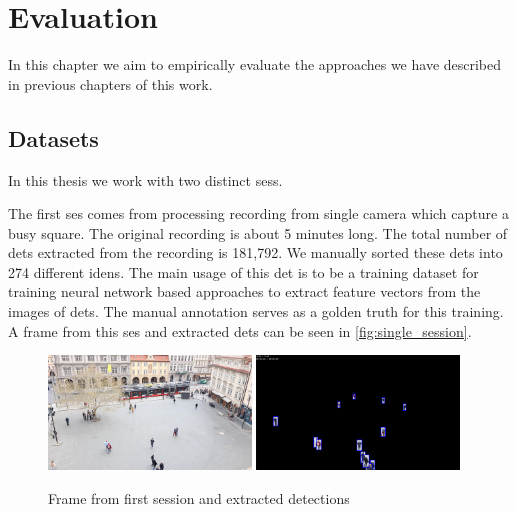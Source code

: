 \chapter{Evaluation}


\label{ch:evaluation}

In this chapter we aim to empirically evaluate the approaches we have described
in previous chapters of this work.

\section{Datasets}

In this thesis we work with two distinct \glspl{ses}.

The first \gls{ses} comes from processing recording from single camera which
capture a busy square. The original recording is about 5 minutes long. The total
number of \glspl{det} extracted from the recording is 181,792. We manually sorted
these \glspl{det} into 274 different \glspl{iden}. The main usage of this
\gls{det} is to be a training dataset for training neural network based
approaches to extract feature vectors from the images of \glspl{det}. The
manual annotation serves as a golden truth for this training. A frame from
this \gls{ses} and extracted \glspl{det} can be seen in
\autoref{fig:single_session}.

\begin{figure}
    \centering
    \includegraphics[width=0.48\textwidth]{img/frame_single_session_smaller.png}
    \includegraphics[width=0.48\textwidth]{img/frame_single_session_det_smaller.png}
    \caption{Frame from first session and extracted detections}
    \label{fig:single_session}
\end{figure}


